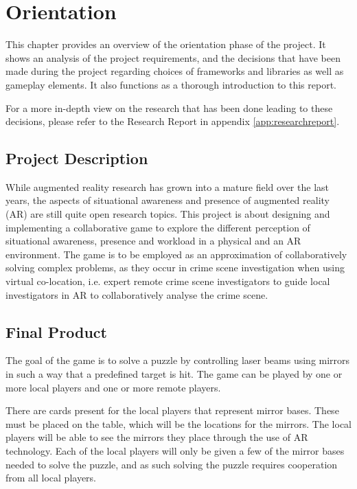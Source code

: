 \chapter{Orientation} \label{cha:orientation}
  This chapter provides an overview of the orientation phase of the project.
  It shows an analysis of the project requirements, and the decisions that
  have been made during the project regarding choices of frameworks and
  libraries as well as gameplay elements. It also functions as a thorough
  introduction to this report.

  For a more in-depth view on the research that has been done leading to
  these decisions, please refer to the Research Report in appendix
  \ref{app:researchreport}.

  \section{Project Description} \label{sec:projectdescription}
    While augmented reality research has grown into a mature field over the
    last years, the aspects of situational awareness and presence of
    augmented reality (AR) are still quite open research topics. This
    project is about designing and implementing a collaborative game to
    explore the different perception of situational awareness, presence and
    workload in a physical and an AR environment. The game is to be employed
    as an approximation of collaboratively solving complex problems, as they
    occur in crime scene investigation when using virtual co-location, i.e.
    expert remote crime scene investigators to guide local investigators in
    AR to collaboratively analyse the crime scene.

  \section{Final Product} \label{sec:finalproduct}
    The goal of the game is to solve a puzzle by controlling laser beams
    using mirrors in such a way that a predefined target is hit. The game
    can be played by one or more local players and one or more remote players.

    There are cards present for the local players that represent mirror
    bases. These must be placed on the table, which will be the locations
    for the mirrors. The local players will be able to see the mirrors they
    place through the use of AR technology. Each of the local players will
    only be given a few of the mirror bases needed to solve the puzzle, and
    as such solving the puzzle requires cooperation from all local players.

